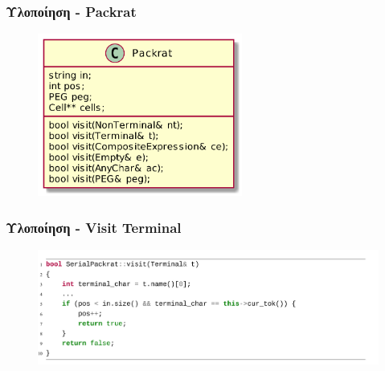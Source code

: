 \documentclass{beamer}
\begin{document}
\begin{frame}
  \frametitle{Υλοποίηση - Packrat}
\begin{figure}[h]
    \centering
	\includegraphics[width=0.60\textwidth]{../transcript/uml/packrat}
\end{figure} 
\end{frame}

\begin{frame}[fragile]
  \frametitle{Υλοποίηση - Visit Terminal}
\begin{figure}[h]
    \centering
	\includegraphics[width=1.10\textwidth]{pics/terminal}
\end{figure} 
\end{frame}
\end{document}
